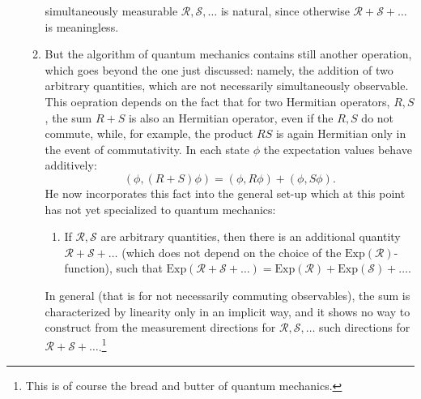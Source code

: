 \documentclass[a4paper]{article}
\theoremstyle{definition}
\theoremstyle{plain}
\begin{document}
\begin{enumerate}
\begin{enumerate}
                simultaneously measurable
                $\mathcal{R},\mathcal{S},\ldots$ is natural,
                since otherwise $\mathcal{R} + \mathcal{S} +
                \ldots$ is meaningless.
            \item But the algorithm of quantum mechanics
                contains still another operation, which goes
                beyond the one just discussed: namely, the
                addition of two arbitrary quantities, which
                are not necessarily simultaneously
                observable. This oepration depends on the
                fact that for two Hermitian operators,
                $R,S$, the sum $R + S$ is also an Hermitian
                operator, even if the $R,S$ do not commute,
                while, for example, the product $RS$ is
                again Hermitian only in the event of
                commutativity. In each state $\phi$ the
                expectation values behave additively: 
                \begin{equation}
                    (\phi,(R+S)\phi)
                    = (\phi, R\phi) + (\phi,S\phi).
                \end{equation} 
                He now incorporates this fact into the
                general set-up which at this point has not
                yet specialized to quantum mechanics:
                \begin{enumerate}
                    \item If $\mathcal{R},\mathcal{S}$ are
                        arbitrary quantities, then there is
                        an additional quantity $\mathcal{R}
                        + \mathcal{S} + \ldots$ (which does
                        not depend on the choice of the
                        $\text{Exp}(\mathcal{R})$-function),
                        such that $\text{Exp}(\mathcal{R} +
                        \mathcal{S} + \ldots) =
                        \text{Exp}(\mathcal{R}) +
                        \text{Exp}(\mathcal{S}) + \ldots$.
                \end{enumerate}
                In general (that is for not necessarily
                commuting observables), the sum is
                characterized by linearity only in an
                implicit way, and it shows no way to
                construct from the measurement directions
                for $\mathcal{R},\mathcal{S},\ldots$ such
                directions for $\mathcal{R} + \mathcal{S} +
                \ldots$.\footnote{This is of course the
                    bread and butter of quantum mechanics.
}
\end{enumerate}
\end{enumerate}
\end{document}

